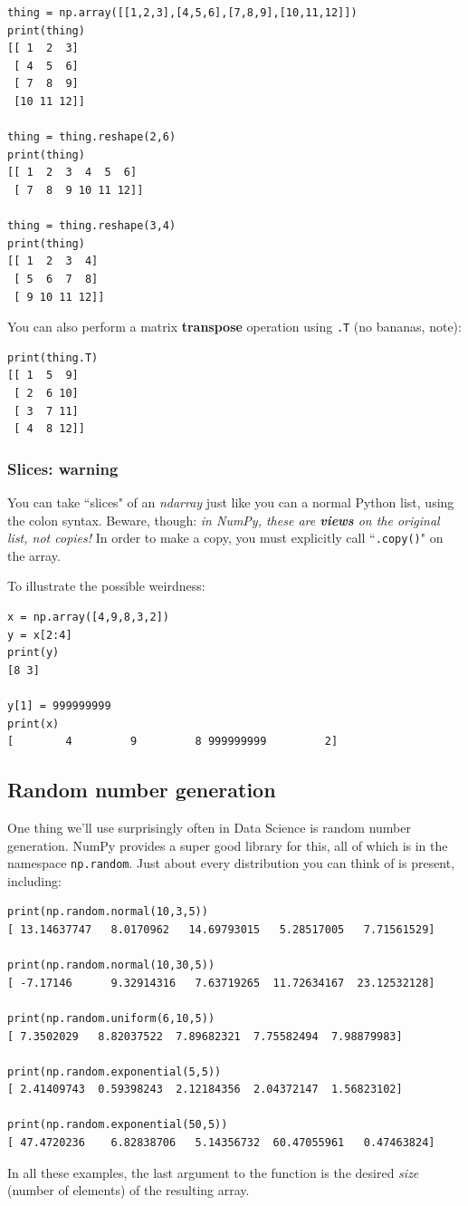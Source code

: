 \documentclass[12pt]{article}
\begin{document}
\begin{Verbatim}[fontsize=small,samepage=true,frame=none]
thing = np.array([[1,2,3],[4,5,6],[7,8,9],[10,11,12]])
print(thing)
[[ 1  2  3]
 [ 4  5  6]
 [ 7  8  9]
 [10 11 12]]

thing = thing.reshape(2,6)
print(thing)
[[ 1  2  3  4  5  6]
 [ 7  8  9 10 11 12]]

thing = thing.reshape(3,4)
print(thing)
[[ 1  2  3  4]
 [ 5  6  7  8]
 [ 9 10 11 12]]
\end{Verbatim}

You can also perform a matrix \textbf{transpose} operation using \texttt{.T}
(no bananas, note):

\begin{Verbatim}[fontsize=small,samepage=true,frame=none]
print(thing.T)
[[ 1  5  9]
 [ 2  6 10]
 [ 3  7 11]
 [ 4  8 12]]
\end{Verbatim}

\subsubsection{Slices: warning}

You can take ``slices" of an \textit{ndarray} just like you can a normal
Python list, using the colon syntax. Beware, though: \textit{in NumPy, these
are \textbf{views} on the original list, not copies!} In order to make a copy,
you must explicitly call ``\texttt{.copy()}" on the array.

To illustrate the possible weirdness:

\begin{Verbatim}[fontsize=small,samepage=true,frame=none]
x = np.array([4,9,8,3,2])
y = x[2:4]
print(y)
[8 3]

y[1] = 999999999
print(x)
[        4         9         8 999999999         2]

\end{Verbatim}

\subsection{Random number generation}

One thing we'll use surprisingly often in Data Science is random number
generation. NumPy provides a super good library for this, all of which is in
the namespace \texttt{np.random}. Just about every distribution you can think
of is present, including:

\begin{Verbatim}[fontsize=small,samepage=true,frame=none]
print(np.random.normal(10,3,5))
[ 13.14637747   8.0170962   14.69793015   5.28517005   7.71561529]

print(np.random.normal(10,30,5))
[ -7.17146      9.32914316   7.63719265  11.72634167  23.12532128]

print(np.random.uniform(6,10,5))
[ 7.3502029   8.82037522  7.89682321  7.75582494  7.98879983]

print(np.random.exponential(5,5))
[ 2.41409743  0.59398243  2.12184356  2.04372147  1.56823102]

print(np.random.exponential(50,5))
[ 47.4720236    6.82838706   5.14356732  60.47055961   0.47463824]
\end{Verbatim}

In all these examples, the last argument to the function is the desired
\textit{size} (number of elements) of the resulting array.
\end{document}
